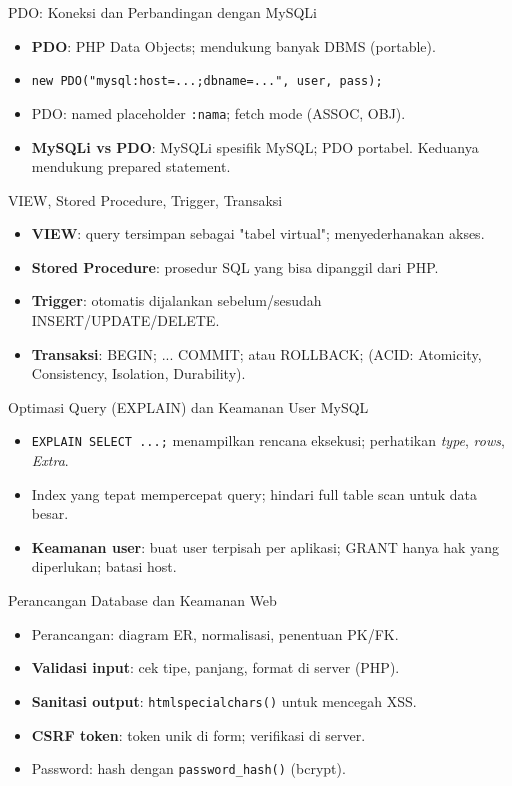 \documentclass[handout]{beamer}
\begin{document}
\begin{frame}{PDO: Koneksi dan Perbandingan dengan MySQLi}
	\begin{itemize}
		\item \textbf{PDO}: PHP Data Objects; mendukung banyak DBMS (portable).
		\item \texttt{new PDO("mysql:host=...;dbname=...", user, pass);}
		\item PDO: named placeholder \texttt{:nama}; fetch mode (ASSOC, OBJ).
		\item \textbf{MySQLi vs PDO}: MySQLi spesifik MySQL; PDO portabel. Keduanya mendukung prepared statement.
	\end{itemize}
\end{frame}

\begin{frame}{VIEW, Stored Procedure, Trigger, Transaksi}
	\begin{itemize}
		\item \textbf{VIEW}: query tersimpan sebagai "tabel virtual"; menyederhanakan akses.
		\item \textbf{Stored Procedure}: prosedur SQL yang bisa dipanggil dari PHP.
		\item \textbf{Trigger}: otomatis dijalankan sebelum/sesudah INSERT/UPDATE/DELETE.
		\item \textbf{Transaksi}: BEGIN; ... COMMIT; atau ROLLBACK; (ACID: Atomicity, Consistency, Isolation, Durability).
	\end{itemize}
\end{frame}

\begin{frame}{Optimasi Query (EXPLAIN) dan Keamanan User MySQL}
	\begin{itemize}
		\item \texttt{EXPLAIN SELECT ...;} menampilkan rencana eksekusi; perhatikan \textit{type}, \textit{rows}, \textit{Extra}.
		\item Index yang tepat mempercepat query; hindari full table scan untuk data besar.
		\item \textbf{Keamanan user}: buat user terpisah per aplikasi; GRANT hanya hak yang diperlukan; batasi host.
	\end{itemize}
\end{frame}

\begin{frame}{Perancangan Database dan Keamanan Web}
	\begin{itemize}
		\item Perancangan: diagram ER, normalisasi, penentuan PK/FK.
		\item \textbf{Validasi input}: cek tipe, panjang, format di server (PHP).
		\item \textbf{Sanitasi output}: \texttt{htmlspecialchars()} untuk mencegah XSS.
		\item \textbf{CSRF token}: token unik di form; verifikasi di server.
		\item Password: hash dengan \texttt{password\_hash()} (bcrypt).
	\end{itemize}
\end{frame}
\end{document}
